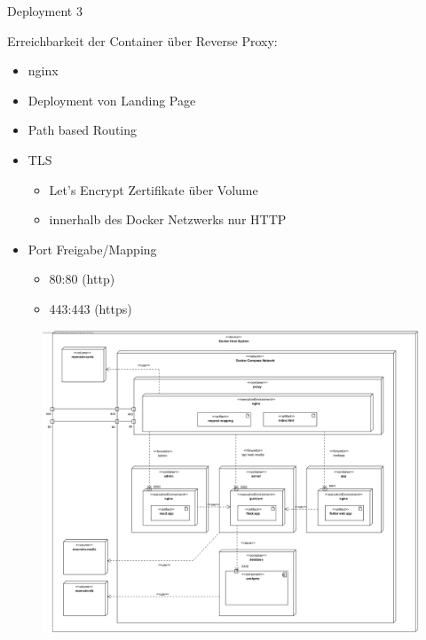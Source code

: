 \begin{frame}{Deployment 3}
    \begin{minipage}[t]{0.35\textwidth}
        Erreichbarkeit der Container über Reverse Proxy:
        \begin{itemize}
            \item nginx
            \item Deployment von Landing Page
            \item Path based Routing
            \item TLS
            \begin{itemize}
                \item Let's Encrypt Zertifikate über Volume
                \item innerhalb des Docker Netzwerks nur HTTP
            \end{itemize}
            \item Port Freigabe/Mapping
            \begin{itemize}
                \item 80:80 (http)
                \item 443:443 (https)
            \end{itemize}
        \end{itemize}
    \end{minipage}
    \hfill
    \begin{minipage}[t]{0.63\textwidth}
        \begin{figure}
            \begin{center}
                \includegraphics[width=\textwidth]{images/deployment/deployment_diagram_full.jpg}
            \end{center}
        \end{figure}
    \end{minipage}
\end{frame}